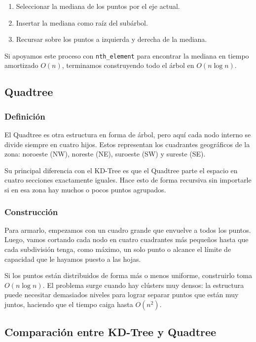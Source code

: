 \documentclass[11pt, a4paper]{article}
\begin{document}
\begin{enumerate}
    \item Seleccionar la mediana de los puntos por el eje actual.
    \item Insertar la mediana como raíz del subárbol.
    \item Recursar sobre los puntos a izquierda y derecha de la mediana.
\end{enumerate}

Si apoyamos este proceso con \texttt{nth_element} para encontrar la mediana en tiempo amortizado $O(n)$, terminamos construyendo todo el árbol en $O(n \log n)$.

\subsection{Quadtree}

\subsubsection{Definición}

El Quadtree \cite{samet1984quadtree} es otra estructura en forma de árbol, pero aquí cada nodo interno se divide siempre en cuatro hijos. Estos representan los cuadrantes geográficos de la zona: noroeste (NW), noreste (NE), suroeste (SW) y sureste (SE).

Su principal diferencia con el KD-Tree es que el Quadtree parte el espacio en cuatro secciones exactamente iguales. Hace esto de forma recursiva sin importarle si en esa zona hay muchos o pocos puntos agrupados.

\subsubsection{Construcción}

Para armarlo, empezamos con un cuadro grande que envuelve a todos los puntos. Luego, vamos cortando cada nodo en cuatro cuadrantes más pequeños hasta que cada subdivisión tenga, como máximo, un solo punto o alcance el límite de capacidad que le hayamos puesto a las hojas.

Si los puntos están distribuidos de forma más o menos uniforme, construirlo toma $O(n \log n)$. El problema surge cuando hay clústers muy densos: la estructura puede necesitar demasiados niveles para lograr separar puntos que están muy juntos, haciendo que el tiempo caiga hasta $O(n^2)$.

\subsection{Comparación entre KD-Tree y Quadtree}
\end{document}
